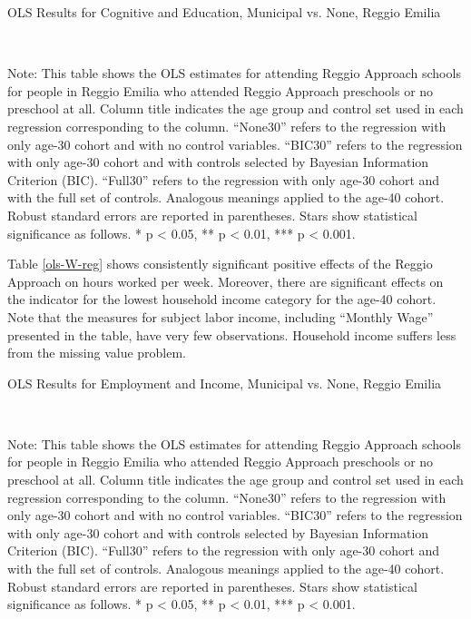 \begin{table}[H] \caption{OLS Results for Cognitive and Education, Municipal vs. None, Reggio Emilia} \label{ols-E-reg}

\vspace{1ex} \\
\footnotesize\raggedright{Note: This table shows the OLS estimates for attending Reggio Approach schools for people in Reggio Emilia who attended Reggio Approach preschools or no preschool at all. Column title indicates the age group and control set used in each regression corresponding to the column. ``None30'' refers to the regression with only age-30 cohort and with no control variables. ``BIC30'' refers to the regression with only age-30 cohort and with controls selected by Bayesian Information Criterion (BIC). ``Full30'' refers to the regression with only age-30 cohort and with the full set of controls. Analogous meanings applied to the age-40 cohort. Robust standard errors are reported in parentheses. Stars show statistical significance as follows. * p < 0.05, ** p < 0.01, *** p < 0.001.}
\end{table}

Table \ref{ols-W-reg} shows consistently significant positive effects of the Reggio Approach on hours worked per week. Moreover, there are significant effects on the indicator for the lowest household income category for the age-40 cohort. Note that the measures for subject labor income, including ``Monthly Wage'' presented in the table, have very few observations. Household income suffers less from the missing value problem.

\begin{table}[H] \caption{OLS Results for Employment and Income, Municipal vs. None, Reggio Emilia} \label{ols-W-reg}
\scalebox{0.92}{
}
\vspace{1ex} \\
\footnotesize\raggedright{Note: This table shows the OLS estimates for attending Reggio Approach schools for people in Reggio Emilia who attended Reggio Approach preschools or no preschool at all. Column title indicates the age group and control set used in each regression corresponding to the column. ``None30'' refers to the regression with only age-30 cohort and with no control variables. ``BIC30'' refers to the regression with only age-30 cohort and with controls selected by Bayesian Information Criterion (BIC). ``Full30'' refers to the regression with only age-30 cohort and with the full set of controls. Analogous meanings applied to the age-40 cohort. Robust standard errors are reported in parentheses. Stars show statistical significance as follows. * p < 0.05, ** p < 0.01, *** p < 0.001.}
\end{table}

